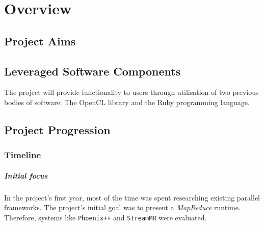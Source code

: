 \chapter{Overview}

\section{Project Aims}


\section{Leveraged Software Components}
The project will provide functionality to users through utilisation of two previous bodies of software: The \ac{OpenCL} library and the Ruby programming language.





\section{Project Progression}
\subsection{Timeline}
\paragraph*{Initial focus}
In the project's first year, most of the time was spent researching existing parallel frameworks. The project's initial goal was to present a \emph{MapReduce} runtime. Therefore, systems like \verb|Phoenix++|\cite{phoenix++} and \verb|StreamMR|\cite{streammr} were evaluated.

